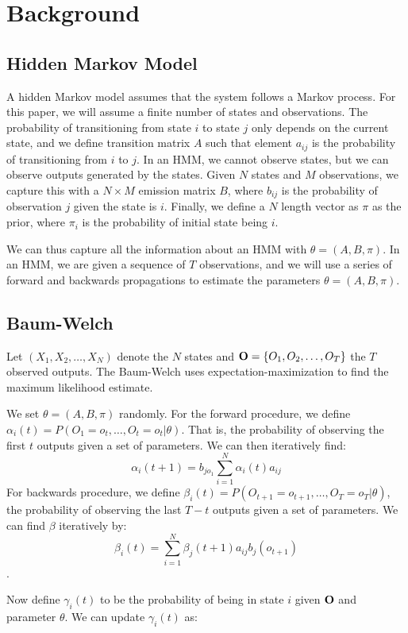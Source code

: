 \section{Background}

\subsection{Hidden Markov Model}
A hidden Markov model assumes that the system follows a Markov process. For this paper, we will assume a finite number of states and observations. The probability of transitioning from state $i$ to state $j$ only depends on the current state, and we define transition matrix $A$ such that element $a_{ij}$ is the probability  of transitioning from $i$ to $j$. In an HMM, we cannot observe states, but we can observe outputs generated by the states. Given $N$ states and $M$ observations, we capture this with a $N \times M$ emission matrix $B$, where $b_{ij}$ is the probability of observation $j$ given the state is $i$. Finally, we define a $N$ length vector as $\pi$ as the prior, where $\pi_i$ is the probability of initial state being $i$. 

We can thus capture all the information about an HMM with $\theta = (A, B, \pi)$. In an HMM, we are given a sequence of $T$ observations, and we will use a series of forward and backwards propagations to estimate the parameters $\theta = (A, B, \pi)$.

\subsection{Baum-Welch}
Let $(X_1, X_2, \ldots, X_N)$ denote the $N$ states and $\bold{O} = \{O_1, O_2, \ldots, O_T\}$ the $T$ observed outputs. The Baum-Welch uses expectation-maximization to find the maximum likelihood estimate.

We set $\theta  =  (A, B, \pi)$ randomly. For the forward procedure, we define $\alpha_i(t) = P(O_1 = o_t, \ldots, O_t = o_t | \theta)$. That is, the probability of observing the first $t$ outputs given a set of parameters. We can then iteratively find:
$$\alpha_i(t+1) =  b_{jo_1}\sum_{i=1}^{N} \alpha_i(t)a_{ij}$$
For backwards procedure, we define $\beta_i(t) = P(O_{t+1} = o_{t+1}, \ldots, O_T = o_T | \theta)$, the probability of observing the last $T - t$ outputs given a set of parameters. We can find $\beta$ iteratively by:
$$\beta_i(t) = \sum_{i=1}^N \beta_j(t+1)a_{ij}b_j(o_{t+1})$$.

Now define $\gamma_i(t)$ to be the probability of being in state $i$ given $\bold{O}$ and parameter $\theta$. We can update $\gamma_i(t)$ as:

